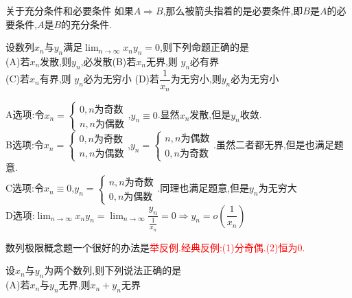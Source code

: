 \documentclass[8pt a4paper, oneside, UTF8]{ctexbook}
\begin{document}
\begin{sloppypar}
\begin{note}
    \end{note}
    \begin{lemma}{关于充分条件和必要条件}{}
        如果$A \Longrightarrow B$,那么被箭头指着的是必要条件,即$B$是$A$的必要条件,$A$是$B$的充分条件.
    \end{lemma}
    \begin{problem}
    设数列${x_n} $与${y_n}$满足$\lim_{n \to \infty} x_ny_n=0$,则下列命题正确的是\\
    (A)若$x_n$发散,则$y_n$,必发散\quad (B)若$x_n$无界,则 $y_n$必有界\\
    (C)若$x_n$有界,则 $y_n$必为无穷小 \quad(D)若$\dfrac{1}{x_n}$为无穷小,则$y_{n}$必为无穷小
    \end{problem}
    \begin{solution}
        A选项:令$x_n=\begin{cases}
                0, n\text{为奇数} \\
                n, n\text{为偶数}
            \end{cases}$,$y_n \equiv 0$.显然$x_n$发散,但是$y_n$收敛.\\
        B选项:令$x_n=\begin{cases}
                0, n\text{为奇数} \\
                n, n\text{为偶数}
            \end{cases}$,$y_n=\begin{cases}
                n, n\text{为偶数} \\
                0, n\text{为奇数}
            \end{cases}$.虽然二者都无界,但是也满足题意.\\
        C选项:令$x_n \equiv 0$,$y_n=\begin{cases}
                n, n\text{为奇数} \\
                0, n\text{为偶数}
            \end{cases}$.同理也满足题意,但是$y_n$为无穷大\\
        D选项:$\lim_{n \to \infty}x_n y_n=\lim_{n \to \infty} \dfrac{y_n}{\frac{1}{x_n}}=0 \Rightarrow y_n=o(\dfrac{1}{x_n})$
    \end{solution}
    \begin{note}
        数列极限概念题一个很好的办法是\textcolor{red}{举反例.经典反例:(1)分奇偶.(2)恒为0.}
    \end{note}
    \begin{problem}
    设$x_n$与${y_n}$为两个数列,则下列说法正确的是\\
    (A)若$ x_n$与${y_n}$无界,则{$ x_n+y_n$}无界\\

\end{problem}
\end{sloppypar}
\end{document}
